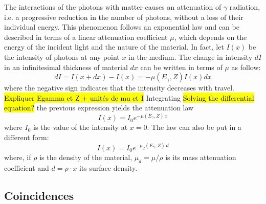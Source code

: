 The interactions of the photons with matter causes an attenuation of $\gamma$ radiation, i.e. a progressive reduction in the number of photons, without a loss of their individual energy.
This phenomenon follows an exponential law and can be described in terms of a linear attenuation coefficient $\mu$, which depends on the energy of the incident light and the nature of the material.
In fact, let $I(x)$ be the intensity of photons at any point $x$ in the medium.
The change in intensity $dI$ in an infinitesimal thickness of material $dx$ can be written in terms of $\mu$ as follow:
\begin{equation}
    dI = I(x + dx) - I(x) = -\mu(E_{\gamma}, Z) I(x) dx
\end{equation}
where the negative sign indicates that the intensity decreases with travel. \hl{Expliquer Egamma et Z + unités de mu et I}  %
Integrating \hl{Solving the differential equation?} the previous expression yields the attenuation law
\begin{equation} \label{eq:attenuation_law}
    I(x) = I_0 e^{-\mu(E_{\gamma}, Z) \, x}
\end{equation}
where $I_0$ is the value of the intensity at $x=0$. 
The law can also be put in a different form:
\begin{equation} \label{eq:attenuation_law_density}
    I(x) = I_0 e^{-\mu_d(E_{\gamma}, Z) \, d}
\end{equation}
where, if $\rho$ is the density of the material, $\mu_d = \mu / \rho$ is its mass attenuation coefficient and $d = \rho \cdot x$ its surface density.

\subsection{Coincidences}
\label{sec:coincidences}

